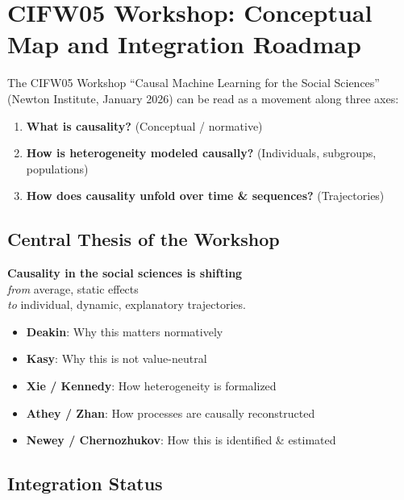 \section{CIFW05 Workshop: Conceptual Map and Integration Roadmap}
\label{sec:iii-cifw05-roadmap}

The CIFW05 Workshop ``Causal Machine Learning for the Social Sciences'' (Newton Institute,
January 2026) can be read as a movement along three axes:

\begin{enumerate}
\item \textbf{What is causality?} (Conceptual / normative)
\item \textbf{How is heterogeneity modeled causally?} (Individuals, subgroups, populations)
\item \textbf{How does causality unfold over time \& sequences?} (Trajectories)
\end{enumerate}

\subsection{Central Thesis of the Workshop}

\begin{tcolorbox}[colback=yellow!5!white, colframe=yellow!75!black,
    title=CIFW05 Central Thesis]
\textbf{Causality in the social sciences is shifting}\\[0.5em]
\emph{from} average, static effects\\
\emph{to} individual, dynamic, explanatory trajectories.

\begin{itemize}[nosep]
\item \textbf{Deakin}: Why this matters normatively
\item \textbf{Kasy}: Why this is not value-neutral
\item \textbf{Xie / Kennedy}: How heterogeneity is formalized
\item \textbf{Athey / Zhan}: How processes are causally reconstructed
\item \textbf{Newey / Chernozhukov}: How this is identified \& estimated
\end{itemize}
\end{tcolorbox}

\subsection{Integration Status}

